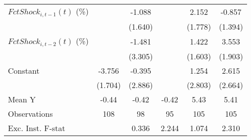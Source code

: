 {\begin{tabular}{l*{5}{c}}
\addlinespace
$ FctShock_{i,t-1}(t)$ (\%)&                     &      -1.088         &                     &       2.152         &      -0.857         \\
                    &                     &     (1.640)         &                     &     (1.778)         &     (1.394)         \\
\addlinespace
$ FctShock_{i,t-2}(t)$ (\%)&                     &      -1.481         &                     &       1.422         &       3.553\sym{*}  \\
                    &                     &     (3.305)         &                     &     (1.603)         &     (1.903)         \\
\addlinespace
Constant            &      -3.756\sym{**} &      -0.395         &                     &       1.254         &       2.615         \\
                    &     (1.704)         &     (2.886)         &                     &     (2.803)         &     (2.664)         \\
\midrule
Mean Y              &       -0.44         &       -0.42         &       -0.42         &        5.43         &        5.41         \\
Observations        &         108         &          98         &          95         &         105         &         105         \\
Exc. Inst. F-stat   &                     &       0.336         &       2.244         &       1.074         &       2.310         \\
\bottomrule
\end{tabular}
}
